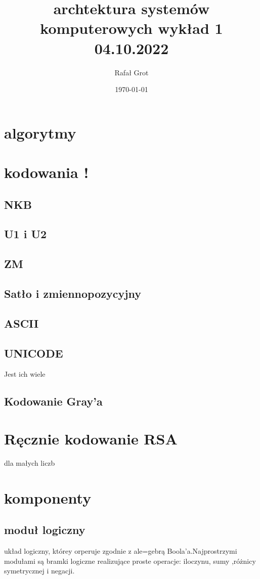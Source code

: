 \documentclass[11pt]{article}
\author{Rafał Grot}
\date{\today}
\title{archtektura systemów komputerowych wykład 1 04.10.2022}
\begin{document}
\maketitle
\tableofcontents

\section{algorytmy}
\label{sec:org3a83d90}
\section{kodowania !}
\label{sec:orgac1e1fe}
\subsection{NKB}
\label{sec:orgee4d612}
\subsection{U1 i U2}
\label{sec:orge2d4b33}
\subsection{ZM}
\label{sec:org9889f04}
\subsection{Satło i zmiennopozycyjny}
\label{sec:orgbfe4e24}
\subsection{ASCII}
\label{sec:orgfb92935}
\subsection{UNICODE}
\label{sec:org27e019a}
Jest ich wiele
\subsection{Kodowanie Gray'a}
\label{sec:orge9445c8}
\section{Ręcznie kodowanie RSA}
\label{sec:orgdac72ab}
dla małych liczb
\section{komponenty}
\label{sec:org580c14a}
\subsection{moduł logiczny}
\label{sec:org61dd6f5}
układ logiczny, którey orperuje zgodnie z ale=gebrą Boola'a.Najprostrzymi modułami są bramki logiczne realizujące proste operacje: iloczynu, sumy ,różnicy symetrycznej i negacji.
\end{document}
